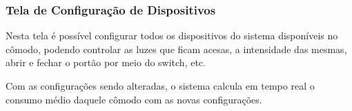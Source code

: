\subsubsection{Tela de Configuração de Dispositivos}


\par Nesta tela é possível configurar todos os dispositivos do sistema disponíveis no cômodo, podendo controlar as luzes que ficam acesas, a intensidade das mesmas, abrir e fechar o portão por meio do switch, etc.
\par Com as configurações sendo alteradas, o sistema calcula em tempo real o consumo médio daquele cômodo com as novas configurações.

